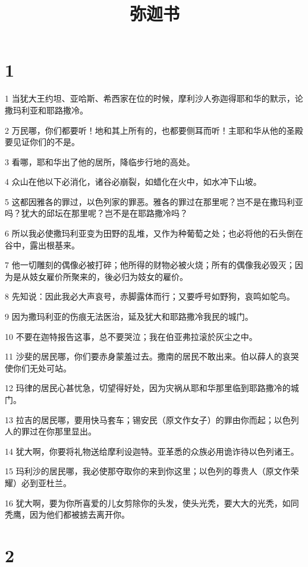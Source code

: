 

\title{弥迦书}


\chapter{1}

\par 1 当犹大王约坦、亚哈斯、希西家在位的时候，摩利沙人弥迦得耶和华的默示，论撒玛利亚和耶路撒冷。
\par 2 万民哪，你们都要听！地和其上所有的，也都要侧耳而听！主耶和华从他的圣殿要见证你们的不是。
\par 3 看哪，耶和华出了他的居所，降临步行地的高处。
\par 4 众山在他以下必消化，诸谷必崩裂，如蜡化在火中，如水冲下山坡。
\par 5 这都因雅各的罪过，以色列家的罪恶。雅各的罪过在那里呢？岂不是在撒玛利亚吗？犹大的邱坛在那里呢？岂不是在耶路撒冷吗？
\par 6 所以我必使撒玛利亚变为田野的乱堆，又作为种葡萄之处；也必将他的石头倒在谷中，露出根基来。
\par 7 他一切雕刻的偶像必被打碎；他所得的财物必被火烧；所有的偶像我必毁灭；因为是从妓女雇价所聚来的，後必归为妓女的雇价。
\par 8 先知说：因此我必大声哀号，赤脚露体而行；又要呼号如野狗，哀鸣如鸵鸟。
\par 9 因为撒玛利亚的伤痕无法医治，延及犹大和耶路撒冷我民的城门。
\par 10 不要在迦特报告这事，总不要哭泣；我在伯亚弗拉滚於灰尘之中。
\par 11 沙斐的居民哪，你们要赤身蒙羞过去。撒南的居民不敢出来。伯以薛人的哀哭使你们无处可站。
\par 12 玛律的居民心甚忧急，切望得好处，因为灾祸从耶和华那里临到耶路撒冷的城门。
\par 13 拉吉的居民哪，要用快马套车；锡安民（原文作女子）的罪由你而起；以色列人的罪过在你那里显出。
\par 14 犹大啊，你要将礼物送给摩利设迦特。亚革悉的众族必用诡诈待以色列诸王。
\par 15 玛利沙的居民哪，我必使那夺取你的来到你这里；以色列的尊贵人（原文作荣耀）必到亚杜兰。
\par 16 犹大啊，要为你所喜爱的儿女剪除你的头发，使头光秃，要大大的光秃，如同秃鹰，因为他们都被掳去离开你。

\chapter{2}

